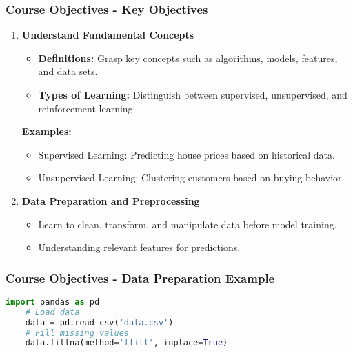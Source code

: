 \documentclass[aspectratio=169]{beamer}
\begin{document}
\begin{frame}
    \frametitle{Course Objectives - Key Objectives}
    \begin{enumerate}
        \item \textbf{Understand Fundamental Concepts}
            \begin{itemize}
                \item \textbf{Definitions:} Grasp key concepts such as algorithms, models, features, and data sets.
                \item \textbf{Types of Learning:} Distinguish between supervised, unsupervised, and reinforcement learning.
            \end{itemize}
            
            \textbf{Examples:}
            \begin{itemize}
                \item Supervised Learning: Predicting house prices based on historical data.
                \item Unsupervised Learning: Clustering customers based on buying behavior.
            \end{itemize}
            
        \item \textbf{Data Preparation and Preprocessing}
            \begin{itemize}
                \item Learn to clean, transform, and manipulate data before model training.
                \item Understanding relevant features for predictions.
            \end{itemize}
    \end{enumerate}
\end{frame}

\begin{frame}[fragile]
    \frametitle{Course Objectives - Data Preparation Example}
    \begin{lstlisting}[language=Python]
    import pandas as pd
    # Load data
    data = pd.read_csv('data.csv')
    # Fill missing values
    data.fillna(method='ffill', inplace=True)
    \end{lstlisting}
\end{frame}
\end{document}
